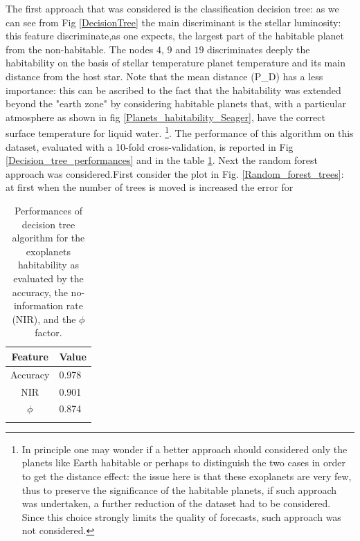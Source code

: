 \documentclass[
12pt, %
a4paper, %
oneside, %
headinclude,footinclude, %
BCOR5mm, %
]{scrartcl}
\begin{document}
The first approach that was considered is the classification decision tree: as we can see from Fig \ref{DecisionTree} the main discriminant is the stellar luminosity: this feature discriminate,as one expects, the largest part of the habitable planet from the non-habitable. The nodes $4$, $9$ and $19$ discriminates deeply the habitability on the basis of stellar temperature planet temperature and its main distance from the host star. Note that the mean distance (P\_D) has a less importance: this can be ascribed to the fact that the habitability was extended beyond the "earth zone" by considering habitable planets that, with a particular atmosphere as shown in fig \ref{Planets_habitability_Seager}, have the correct surface temperature for liquid water. 
\footnote{In principle one may wonder if a better approach should considered only the planets like Earth habitable or perhaps to distinguish the two cases in order to get the distance effect: the issue here is that these exoplanets are very few, thus to preserve the significance of the habitable planets, if such approach was undertaken, a further reduction of the dataset had to be considered. Since this choice strongly limits the quality of forecasts, such approach was not considered.}. The performance of this algorithm on this dataset, evaluated with a 10-fold cross-validation, is reported in Fig \ref{Decision_tree_performances} and in the table \ref{DecisionTree_perf_tab}. Next the random forest approach was considered.First consider the plot in Fig. \ref{Random_forest_trees}: at first when the number of trees is moved is increased the error for




\clearpage

\begin{table}[]
\caption{Performances of decision tree algorithm for the exoplanets habitability as evaluated by the accuracy, the no-information rate (NIR), and the $\phi$ factor.}
\begin{center}
\begin{tabular}{l|l}
\multicolumn{1}{c|}{Feature} & Value \\ \hline
\multicolumn{1}{c|}{Accuracy} & 0.978 \\ \hline
\multicolumn{1}{c|}{NIR} & 0.901 \\ \hline
\multicolumn{1}{c|}{$\phi$} & 0.874 \\ 
\label{DecisionTree_perf_tab}
\end{tabular}
\end{center}
\end{table}
\end{document}
